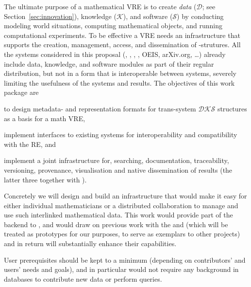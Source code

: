 \begin{workpackage}[id=dksbases,%
  title=Dks/Knowledge/Software-Bases,lead=JU,
  ZHRM=12,JURM=36,USHRM=12,UWRM=25,SARM=10,LLRM=2,PSRM=4]

\begin{wpobjectives}
  The ultimate purpose of a mathematical VRE is to create \emph{data} ($\mathcal{D}$; see
  Section~\ref{sec:innovation}), knowledge ($\mathcal{K}$), and software ($\mathcal{S}$)
  by conducting modeling world situations, computing mathematical objects, and running
  computational experiments. To be effective a VRE needs an infrastructure that supports
  the creation, management, access, and dissemination of \DKS-strutures.  All
  the systems considered in this proposal (\GAP, \Sage, \Pari, \Singular, OEIS, arXiv.org,
  \ldots) already include data, knowledge, and software modules as part of their regular
  distribution, but not in a form that is interoperable between systems, severely limiting
  the usefulness of the systems and results. The objectives of this work package are
\begin{compactenum}
\item to design metadata- and representation formats for trans-system $\mathcal{DKS}$
  structures as a basis for a math VRE, 
\item implement interfaces to existing systems for interoperability and compatibility with
  the RE, and
\item implement a joint \DKS infrastructure for, searching, documentation, traceability,
  versioning, provenance, visualisation and native dissemination of \TheProject results
  (the latter three together with ).
\end{compactenum}
Concretely we will design and build an infrastructure that would make it easy for either
individual mathematicians or a distributed collaboration to manage and use such
interlinked mathematical data. This work would provide part of the backend to ,
and would draw on previous work with the \LMFDB and \FindStat (which will be treated as
prototypes for our purposes, to serve as exemplars to other projects) and in return will
substantially enhance their capabilities.

User prerequisites should be kept to a minimum (depending on contributors' and users'
needs and goals), and in particular would not require any background in databases to
contribute new data or perform queries.
\end{wpobjectives}


\end{workpackage}
